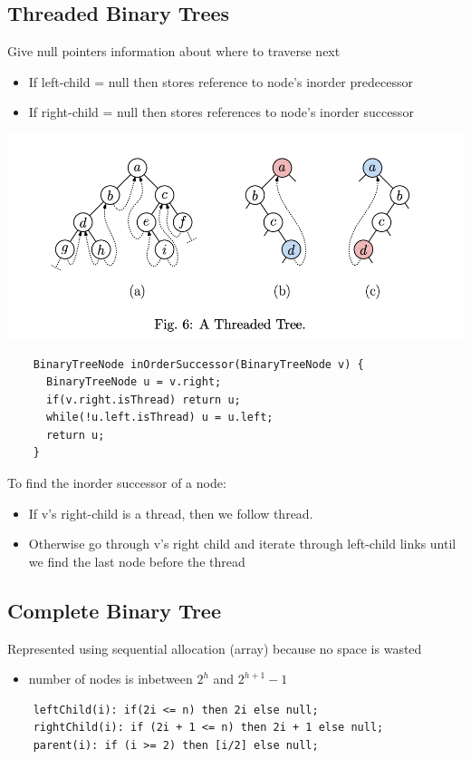\documentclass{article}
\begin{document}
  \subsection{Threaded Binary Trees}
  Give null pointers information about where to traverse next
  \begin{itemize}
  \item If left-child = null then stores reference to node's inorder predecessor
  \item If right-child = null then stores references to node's inorder successor
  \end{itemize}
  \begin{center}
  \includegraphics[scale=0.3]{Fig_6}
  \end{center}
  \begin{lstlisting}
    BinaryTreeNode inOrderSuccessor(BinaryTreeNode v) {
      BinaryTreeNode u = v.right;
      if(v.right.isThread) return u;
      while(!u.left.isThread) u = u.left;
      return u;
    }
  \end{lstlisting}
  To find the inorder successor of a node:
  \begin{itemize}[noitemsep]
  \item If v's right-child is a thread, then we follow thread.
  \item Otherwise go through v's right child and iterate through left-child links until we find the last node before the thread
  \end{itemize}
  \subsection{Complete Binary Tree}
  Represented using sequential allocation (array) because no space is wasted
  \begin{itemize}[noitemsep]
  \item number of nodes is inbetween $2^{h}$ and $2^{h+1}-1$
  \end{itemize}
  \begin{lstlisting}
    leftChild(i): if(2i <= n) then 2i else null;
    rightChild(i): if (2i + 1 <= n) then 2i + 1 else null;
    parent(i): if (i >= 2) then [i/2] else null;
  \end{lstlisting}
  \newpage
\end{document}
